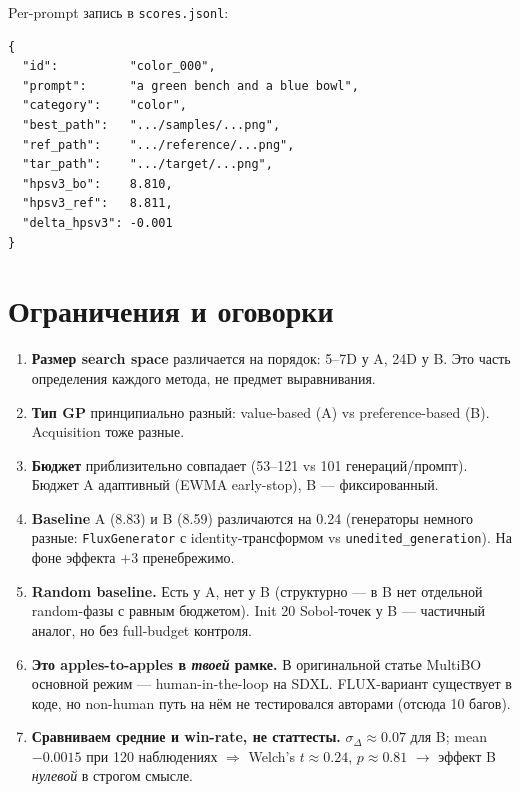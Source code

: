 \documentclass[11pt,a4paper]{article}
\begin{document}
Per-prompt запись в \texttt{scores.jsonl}:
\begin{lstlisting}
{
  "id":          "color_000",
  "prompt":      "a green bench and a blue bowl",
  "category":    "color",
  "best_path":   ".../samples/...png",
  "ref_path":    ".../reference/...png",
  "tar_path":    ".../target/...png",
  "hpsv3_bo":    8.810,
  "hpsv3_ref":   8.811,
  "delta_hpsv3": -0.001
}
\end{lstlisting}

\section{Ограничения и оговорки}

\begin{enumerate}[leftmargin=2em,itemsep=4pt]
  \item \textbf{Размер search space} различается на порядок: 5--7D у A,
        24D у B. Это часть определения каждого метода, не предмет
        выравнивания.
  \item \textbf{Тип GP} принципиально разный: value-based (A) vs
        preference-based (B). Acquisition тоже разные.
  \item \textbf{Бюджет} приблизительно совпадает (53--121 vs 101
        генераций/промпт). Бюджет A адаптивный (EWMA early-stop),
        B --- фиксированный.
  \item \textbf{Baseline} A (8.83) и B (8.59) различаются на 0.24
        (генераторы немного разные: \texttt{FluxGenerator} с identity-трансформом
        vs \texttt{unedited\_generation}). На фоне эффекта $+3$
        пренебрежимо.
  \item \textbf{Random baseline.} Есть у A, нет у B (структурно ---
        в B нет отдельной random-фазы с равным бюджетом).
        Init 20 Sobol-точек у B --- частичный аналог, но без full-budget
        контроля.
  \item \textbf{Это apples-to-apples в \emph{твоей} рамке.} В
        оригинальной статье MultiBO основной режим ---
        human-in-the-loop на SDXL. FLUX-вариант существует в коде, но
        non-human путь на нём не тестировался авторами (отсюда 10 багов).
  \item \textbf{Сравниваем средние и win-rate, не статтесты.}
        $\sigma_\Delta \approx 0.07$ для B; mean $-0.0015$ при 120
        наблюдениях $\Rightarrow$ Welch's $t \approx 0.24$, $p \approx 0.81$
        $\to$ эффект B \emph{нулевой} в строгом смысле.
\end{enumerate}
\end{document}
